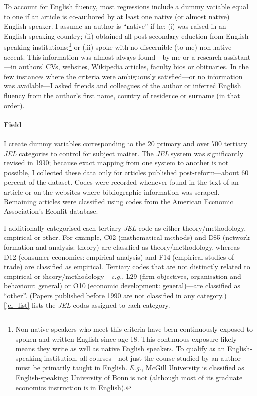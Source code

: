 \begin{appendices}
\begin{refsection}
To account for English fluency, most regressions include a dummy variable equal to one if an article is co-authored by at least one native (or almost native) English speaker. I assume an author is ``native'' if he: (i) was raised in an English-speaking country; (ii) obtained all post-secondary eduction from English speaking institutions;\footnote{Non-native speakers who meet this criteria have been continuously exposed to spoken and written English since age 18. This continuous exposure likely means they write as well as native English speakers. To qualify as an English-speaking institution, all courses---not just the course studied by an author---must be primarily taught in English. \emph{E.g.}, McGill University is classified as English-speaking; University of Bonn is not (although most of its graduate economics instruction is in English).} or (iii) spoke with no discernible (to me) non-native accent. This information was almost always found---by me or a research assistant---in authors' CVs, websites, Wikipedia articles, faculty bios or obituaries. In the few instances where the criteria were ambiguously satisfied---or no information was available---I asked friends and colleagues of the author or inferred English fluency from the author's first name, country of residence or surname (in that order).

\paragraph{Field}
\label{appendixcontrolsfield}

I create dummy variables corresponding to the 20 primary and over 700 tertiary \emph{JEL} categories to control for subject matter. The \emph{JEL} system was significantly revised in 1990; because exact mapping from one system to another is not possible, I collected these data only for articles published post-reform---about 60 percent of the dataset. Codes were recorded whenever found in the text of an article or on the websites where bibliographic information was scraped. Remaining articles were classified using codes from the American Economic Association's Econlit database.

I additionally categorised each tertiary \emph{JEL} code as either theory\slash methodology, empirical or other. For example, C02 (mathematical methods) and D85 (network formation and analysis: theory) are classified as theory\slash methodology, whereas D12 (consumer economics: empirical analysis) and F14 (empirical studies of trade) are classified as empirical. Tertiary codes that are not distinctly related to empirical or theory\slash methodology---\emph{e.g.}, L29 (firm objectives, organisation and behaviour: general) or O10 (economic development: general)---are classified as ``other''. (Papers published before 1990 are not classified in any category.) \autoref{jel_list} lists the \emph{JEL} codes assigned to each category.


\end{refsection}
\end{appendices}
